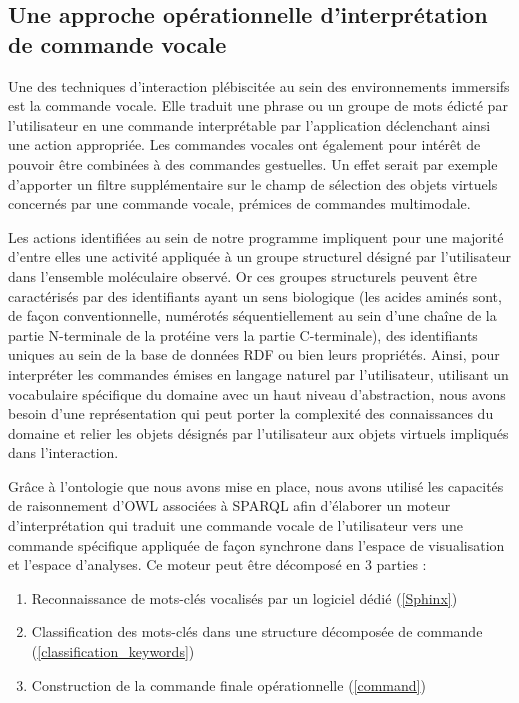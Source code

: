 \subsection{Une approche opérationnelle d'interprétation de commande vocale}

Une des techniques d'interaction plébiscitée au sein des environnements immersifs est la commande vocale. Elle traduit une phrase ou un groupe de mots édicté par l'utilisateur en une commande interprétable par l'application déclenchant ainsi une action appropriée. Les commandes vocales ont également pour intérêt de pouvoir être combinées à des commandes gestuelles. Un effet serait par exemple d'apporter un filtre supplémentaire sur le champ de sélection des objets virtuels concernés par une commande vocale, prémices de commandes multimodale.

Les actions identifiées au sein de notre programme impliquent pour une majorité d'entre elles une activité appliquée à un groupe structurel désigné par l'utilisateur dans l'ensemble moléculaire observé. Or ces groupes structurels peuvent être caractérisés par des identifiants ayant un sens biologique (les acides aminés sont, de façon conventionnelle, numérotés séquentiellement au sein d'une chaîne de la partie N-terminale de la protéine vers la partie C-terminale), des identifiants uniques au sein de la base de données RDF ou bien leurs propriétés. Ainsi, pour interpréter les commandes émises en langage naturel par l'utilisateur, utilisant un vocabulaire spécifique du domaine avec un haut niveau d'abstraction, nous avons besoin d'une représentation qui peut porter la complexité des connaissances du domaine et relier les objets désignés par l'utilisateur aux objets virtuels impliqués dans l'interaction.

Grâce à l'ontologie que nous avons mise en place, nous avons utilisé les capacités de raisonnement d'OWL associées à SPARQL afin d'élaborer un moteur d'interprétation qui traduit une commande vocale de l'utilisateur vers une commande spécifique appliquée de façon synchrone dans l'espace de visualisation et l'espace d'analyses.
Ce moteur peut être décomposé en 3 parties :

\begin{enumerate}
  \item Reconnaissance de mots-clés vocalisés par un logiciel dédié (\ref{Sphinx})
  \item Classification des mots-clés dans une structure décomposée de commande (\ref{classification_keywords})
  \item Construction de la commande finale opérationnelle (\ref{command})
\end{enumerate}

